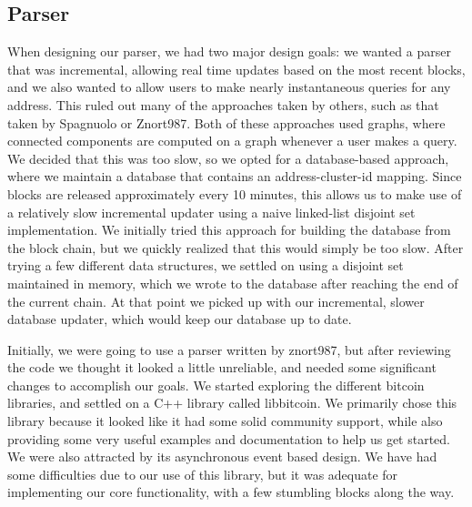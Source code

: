 \documentclass[10pt, letterpaper, twocolumn, twoside]{article}
\begin{document}
\subsection{Parser}
When designing our parser, we had two major design goals: we wanted a parser that was incremental, allowing real time updates based on the most recent blocks, and we also wanted to allow users to make nearly instantaneous queries for any address. This ruled out many of the approaches taken by others, such as that taken by Spagnuolo\cite{bitiodine} or Znort987\cite{znort}. Both of these approaches used graphs, where connected components are computed on a graph whenever a user makes a query. We decided that this was too slow, so we opted for a database-based approach, where we maintain a database that contains an address-cluster-id mapping. Since blocks are released
approximately every 10 minutes, this allows us to make use of a relatively slow incremental updater using a naive linked-list disjoint set implementation. We initially tried this approach for building the database from the block chain, but we quickly realized that this would simply be too slow. After trying a few different data structures, we settled on using a disjoint set maintained in memory, which we wrote to the database after reaching the end of the current chain. At that point we picked up with our incremental, slower database updater, which would keep our database up to date.

Initially, we were going to use a parser written by znort987\cite{znort}, but after reviewing the code we thought it looked a little unreliable, and needed some significant changes to accomplish our goals. We started exploring the different bitcoin libraries, and settled on a C++ library called libbitcoin\cite{libbitcoin}. We primarily chose this library because it looked like it had some solid community support, while also providing some very useful examples and documentation to help us get started. We were also attracted by its asynchronous event based design. We have had some difficulties due to our use of this library, but it was adequate for implementing our core functionality, with a few stumbling blocks along the way.
\end{document}
